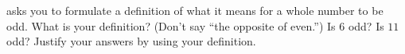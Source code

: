  asks you to formulate a definition of what it means for a whole number to be odd.  What is your definition?  (Don't say ``the opposite of even.'')  Is $6$ odd?  Is $11$ odd?  Justify your answers by using your definition.